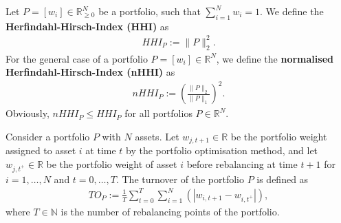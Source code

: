         
        
        \begin{definition} %
            Let $P = [w_i] \in \mathbb{R}_{\geq 0}^N$ be a portfolio, such that $\sum_{i=1}^N w_i = 1$. We define the \textbf{Herfindahl-Hirsch-Index (HHI)} as
            \begin{align*}
                HHI_P := \| P \|_2^2.
            \end{align*}
            For the general case of a portfolio $P = [w_i] \in \mathbb{R}^N$, we define the \textbf{normalised Herfindahl-Hirsch-Index (nHHI)} as
            \begin{align*}
                nHHI_P := \left( \frac{\| P \|_2}{\| P \|_1} \right)^2. %
            \end{align*}
            Obviously, $nHHI_P \leq HHI_P$ for all portfolios $P \in \mathbb{R}^N$.
        \end{definition}
        
        \begin{definition}
            Consider a portfolio $P$ with $N$ assets. Let $w_{j,t+1} \in \mathbb{R}$ be the portfolio weight assigned to asset $i$ at time $t$ by the portfolio optimisation method, and let $w_{j,t^+} \in \mathbb{R}$ be the portfolio weight of asset $i$ before rebalancing at time $t+1$ for $i=1, \dots, N$ and $t=0, \dots, T$. The turnover of the portfolio $P$ is defined as
            \begin{align*}
                TO_P := \frac{1}{T} \sum_{t=0}^T \sum_{i=1}^N \left( \left| w_{i, t+1} - w_{i, t^+} \right| \right),
            \end{align*}
            where $T \in \mathbb{N}$ is the number of rebalancing points of the portfolio.
        \end{definition}
        
